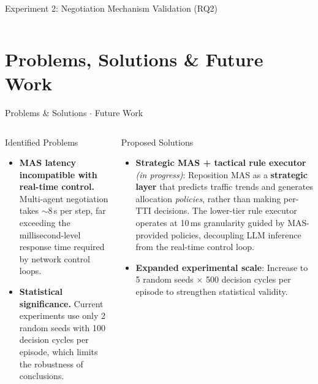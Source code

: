 \documentclass[9pt,aspectratio=169]{beamer}
\begin{document}
\begin{frame}{Experiment 2: Negotiation Mechanism Validation (RQ2)}
\begin{columns}[T]
\end{columns}
\end{frame}


\section{Problems, Solutions \& Future Work}
\begin{frame}{Problems \& Solutions $\cdot$ Future Work}
\begin{columns}[T]

\begin{alertblock}{\scriptsize Identified Problems}
\scriptsize
\begin{itemize}
\item \textbf{MAS latency incompatible with real-time control.} Multi-agent negotiation takes $\sim$8\,s per step, far exceeding the millisecond-level response time required by network control loops.

\vspace{3pt}
\item \textbf{Statistical significance.} Current experiments use only 2 random seeds with 100 decision cycles per episode, which limits the robustness of conclusions.
\end{itemize}
\end{alertblock}

\vspace{3pt}

\begin{exampleblock}{\scriptsize Proposed Solutions}
\scriptsize
\begin{itemize}
\item \textbf{Strategic MAS + tactical rule executor} \textit{(in progress)}: Reposition MAS as a \textbf{strategic layer} that predicts traffic trends and generates allocation \textit{policies}, rather than making per-TTI decisions. The lower-tier rule executor operates at 10\,ms granularity guided by MAS-provided policies, decoupling LLM inference from the real-time control loop.

\vspace{3pt}
\item \textbf{Expanded experimental scale}: Increase to 5 random seeds $\times$ 500 decision cycles per episode to strengthen statistical validity.
\end{itemize}
\end{exampleblock}



\end{columns}
\end{frame}
\end{document}
